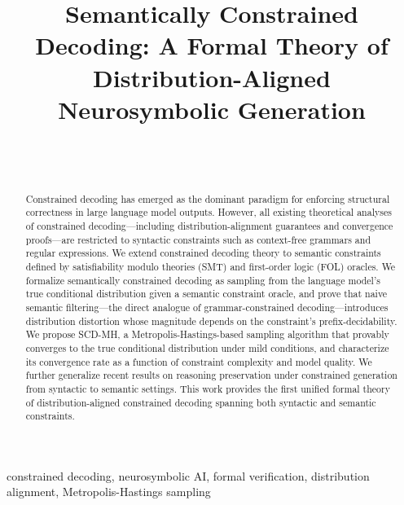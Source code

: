\documentclass[twoside,11pt]{article}
\begin{document}
\title{Semantically Constrained Decoding: A Formal Theory of\\
Distribution-Aligned Neurosymbolic Generation}

\author{ \email [email]\\
       \addr [Affiliation]\\
       [Address]}


\maketitle

\begin{abstract}%
Constrained decoding has emerged as the dominant paradigm for enforcing
structural correctness in large language model outputs. However, all
existing theoretical analyses of constrained decoding---including
distribution-alignment guarantees and convergence proofs---are restricted
to syntactic constraints such as context-free grammars and regular
expressions. We extend constrained decoding theory to semantic
constraints defined by satisfiability modulo theories (SMT) and
first-order logic (FOL) oracles. We formalize semantically constrained
decoding as sampling from the language model's true conditional
distribution given a semantic constraint oracle, and prove that naive
semantic filtering---the direct analogue of grammar-constrained
decoding---introduces distribution distortion whose magnitude depends on
the constraint's prefix-decidability. We propose SCD-MH, a
Metropolis-Hastings-based sampling algorithm that provably converges to
the true conditional distribution under mild conditions, and
characterize its convergence rate as a function of constraint complexity
and model quality. We further generalize recent results on reasoning
preservation under constrained generation from syntactic to semantic
settings. This work provides the first unified formal theory of
distribution-aligned constrained decoding spanning both syntactic and
semantic constraints.
\end{abstract}

\begin{keywords}
constrained decoding, neurosymbolic AI, formal verification, distribution alignment, Metropolis-Hastings sampling
\end{keywords}
\end{document}
